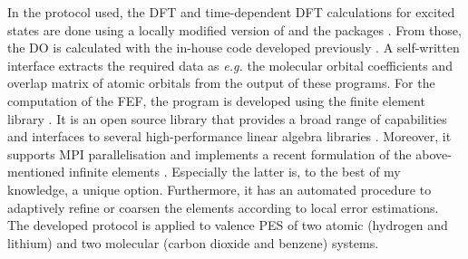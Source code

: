 In the protocol used, the DFT and time-dependent DFT calculations for excited states are done using a locally modified version of  \cite{nwchem} and the  packages \cite{g09}.
From those, the DO is calculated with the in-house code  developed previously \cite{MAgg}.
A self-written interface extracts the required data as \textit{e.g.} the molecular orbital coefficients and overlap matrix of atomic orbitals from the output of these programs.
For the computation of the FEF, the program  \cite{FreeWilly} is developed using the finite element library  \cite{libmesh}. 
It is an open source library that provides a broad range of capabilities and interfaces to several high-performance linear algebra libraries \cite{slepc1,slepc2,petsc}.
Moreover, it supports MPI parallelisation and implements a recent formulation of the above-mentioned infinite elements \cite{dreyer}.
Especially the latter is, to the best of my knowledge, a unique option.
Furthermore, it has an automated procedure to adaptively refine or coarsen the elements according to local error estimations.
%
The developed protocol is applied to valence PES of two atomic (hydrogen and lithium) and two molecular (carbon dioxide and benzene) systems.
